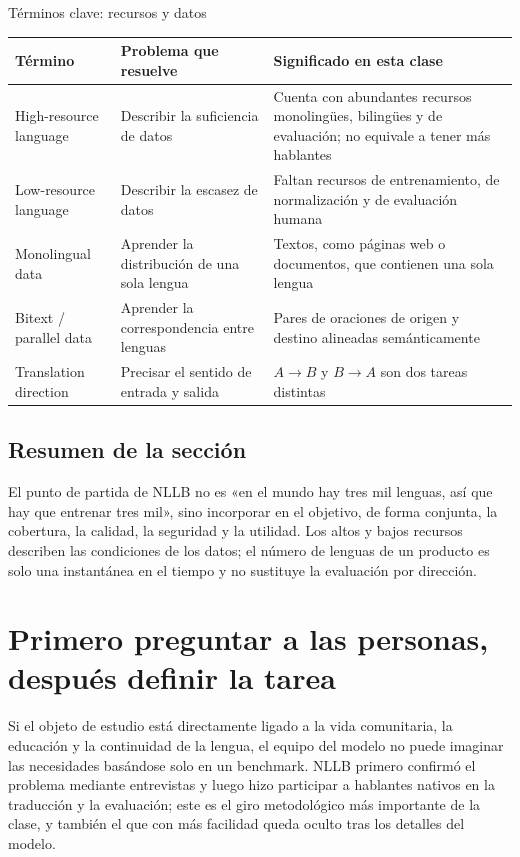 \documentclass[a4paper]{article}
\begin{document}
\begin{knowledgebox}{Términos clave: recursos y datos}
\begin{tabularx}{\textwidth}{@{}L{0.21\textwidth}L{0.28\textwidth}X@{}}
\toprule
Término & Problema que resuelve & Significado en esta clase \\
\midrule
High-resource language & Describir la suficiencia de datos & Cuenta con abundantes recursos monolingües, bilingües y de evaluación; no equivale a tener más hablantes \\
Low-resource language & Describir la escasez de datos & Faltan recursos de entrenamiento, de normalización y de evaluación humana \\
Monolingual data & Aprender la distribución de una sola lengua & Textos, como páginas web o documentos, que contienen una sola lengua \\
Bitext / parallel data & Aprender la correspondencia entre lenguas & Pares de oraciones de origen y destino alineadas semánticamente \\
Translation direction & Precisar el sentido de entrada y salida & $A\rightarrow B$ y $B\rightarrow A$ son dos tareas distintas \\
\bottomrule
\end{tabularx}
\end{knowledgebox}

\subsection{Resumen de la sección}

El punto de partida de NLLB no es «en el mundo hay tres mil lenguas, así que hay que entrenar tres mil», sino incorporar en el objetivo, de forma conjunta, la cobertura, la calidad, la seguridad y la utilidad. Los altos y bajos recursos describen las condiciones de los datos; el número de lenguas de un producto es solo una instantánea en el tiempo y no sustituye la evaluación por dirección.
\section{Primero preguntar a las personas, después definir la tarea}

Si el objeto de estudio está directamente ligado a la vida comunitaria, la educación y la continuidad de la lengua, el equipo del modelo no puede imaginar las necesidades basándose solo en un benchmark. NLLB primero confirmó el problema mediante entrevistas y luego hizo participar a hablantes nativos en la traducción y la evaluación; este es el giro metodológico más importante de la clase, y también el que con más facilidad queda oculto tras los detalles del modelo.
\end{document}
